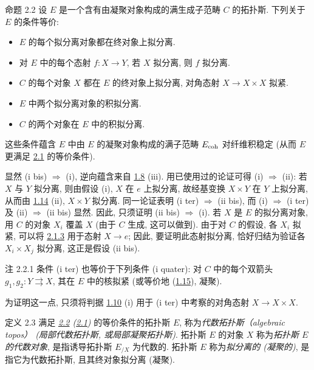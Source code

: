 \begin{enonce*}{命题 2.2}
设 $E$ 是一个含有由凝聚对象构成的满生成子范畴 $C$ 的拓扑斯.
下列关于 $E$ 的条件等价:
\begin{itemize}
\item[(i)] $E$ 的每个拟分离对象都在终对象上拟分离.

\item[(i bis)] 对 $E$ 中的每个态射 $f:X\to Y$,
若 $X$ 拟分离, 则 $f$ 拟分离.

\item[(i ter)] $C$ 的每个对象 $X$ 都在 $E$ 的终对象上拟分离,
\ie 对角态射 $X\to X\times X$ 拟紧.

\item[(ii)] $E$ 中两个拟分离对象的积\pageoriginale{}拟分离.

\item[(ii bis)] $C$ 的两个对象在 $E$ 中的积拟分离.
\end{itemize}

这些条件蕴含 $E$ 中由 $E$ 的凝聚对象构成的满子范畴 $E_{\mathrm{coh}}$
对纤维积稳定
(从而 $E$ 更满足 \hyperref[VI.prop2.1]{2.1} 的等价条件).
\end{enonce*}

显然 (i bis) $\Rightarrow$ (i),
逆向蕴含来自 \hyperref[VI.prop1.8]{1.8} (iii).
用已使用过的论证可得 (i) $\Rightarrow$ (ii):
若 $X$ 与 $Y$ 拟分离, 则由假设 (i), $X$ 在 $e$ 上拟分离,
故经基变换 $X\times Y$ 在 $Y$ 上拟分离,
从而由 \hyperref[VI.prop1.14]{1.14} (ii), $X\times Y$ 拟分离.
同一论证表明 (i ter) $\Rightarrow$ (ii bis),
而 (i) $\Rightarrow$ (i ter) 及 (ii) $\Rightarrow$ (ii bis) 显然.
因此, 只须证明 (ii bis) $\Rightarrow$ (i).
若 $X$ 是 $E$ 的拟分离对象,
用 $C$ 的对象 $X_i$ 覆盖 $X$
(由于 $C$ 生成, 这可以做到).
由于对 $C$ 的假设, 各 $X_i$ 拟紧,
可以将 \hyperref[VI.lem2.1.3]{2.1.3} 用于态射 $X\to e$;
因此, 要证明此态射拟分离,
恰好归结为验证各 $X_i\times X_j$ 拟分离,
这正是假设 (ii bis).

\begin{enonce*}[remark]{注 2.2.1}
条件 (i ter) 也等价于下列条件 (i quater):
对 $C$ 中的每个双箭头 $g_1,g_2:Y\rightrightarrows X$,
其在 $E$ 中的核拟紧
(或等价地 (\hyperref[VI.cor1.15]{1.15}), 凝聚).
\end{enonce*}

为\pageoriginale{}证明这一点,
只须将判据 \hyperref[VI.prop1.10]{1.10} (i)
用于 (i ter) 中考察的对角态射 $X\to X\times X$.

\begin{enonce*}{定义 2.3}
满足 \emph{\hyperref[VI.prop2.2]{2.2}
(\resp \hyperref[VI.prop2.1]{2.1})} 的等价条件的拓扑斯 $E$,
称为\emph{代数拓扑斯（algebraic topos）
(\resp 局部代数拓扑斯, 或局部凝聚拓扑斯)}.
拓扑斯 $E$ 的对象 $X$ 称为\emph{拓扑斯 $E$ 的代数对象},
是指诱导拓扑斯 $E_{/X}$ 为代数的.
拓扑斯 $E$ 称为\emph{拟分离的 (\resp 凝聚的)},
是指它为代数拓扑斯,
且其终对象拟分离 (\resp 凝聚).
\end{enonce*}

